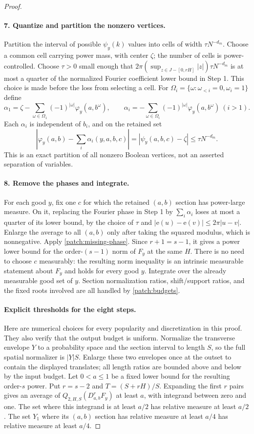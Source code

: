 \documentclass[11pt]{article}
\theoremstyle{definition}
\newcommand{\ee}[1]{\mathrm e\!\left(#1\right)}
\begin{document}
\begin{proof}
\paragraph{7. Quantize and partition the nonzero vertices.}
Partition the interval of possible $\psi_y(k)$ values into cells of width $\tau N^{-d_m}$.
Choose a common cell carrying power mass, with center $\zeta$; the number of cells is
power-controlled.  Choose $\tau>0$ small enough that
$2\pi(\sup_{z\in J-[0,rH]}|z|)\tau N^{-d_m}$ is at most a quarter of the normalized Fourier
coefficient lower bound in Step 1.  This choice is made before the loss from selecting a cell.
For $\Omega_i=\{\omega:\omega_{<i}=0,\omega_i=1\}$ define
\[
 \alpha_1=\zeta-\sum_{\omega\in\Omega_1}(-1)^{|\omega|}\varphi_y(a,b^\omega),
 \qquad
 \alpha_i=-\sum_{\omega\in\Omega_i}(-1)^{|\omega|}\varphi_y(a,b^\omega)\ (i>1).
\]
Each $\alpha_i$ is independent of $b_i$, and on the retained set
\[
 \left|\varphi_y(a,b)-\sum_i\alpha_i(y,a,b,c)\right|
       =|\psi_y(a,b,c)-\zeta|\leq\tau N^{-d_m}.
\]
This is an exact partition of all nonzero Boolean vertices, not an asserted separation of
variables.

\paragraph{8. Remove the phases and integrate.}
For each good $y$, fix one $c$ for which the retained $(a,b)$ section has power-large measure.
On it, replacing the Fourier phase in Step 1 by $\sum_i\alpha_i$ loses at most a quarter of
its lower bound, by the choice of $\tau$ and $|\ee u-\ee v|\leq2\pi|u-v|$.
Enlarge the average to all $(a,b)$ only after taking the squared modulus, which is nonnegative.
Apply \cref{patch:missing-phase}.  Since $r+1=s-1$, it gives a power lower bound for the
order-$(s-1)$ norm of $F_y$ at the same $H$.
There is no need to choose $c$ measurably: the resulting norm inequality is an intrinsic
measurable statement about $F_y$ and holds for every good $y$.
Integrate over the already measurable good set of $y$.  Section normalization ratios,
shift/support ratios, and the fixed roots involved are all handled by \cref{patch:budgets}.

\paragraph{Explicit thresholds for the eight steps.}
Here are numerical choices for every popularity and discretization in this proof. They also
verify that the output budget is uniform. Normalize the transverse envelope $Y$ to a probability
space and the section interval to length $S$, so the full spatial normalizer is $|Y|S$.
Enlarge these two envelopes once at the outset to contain the displayed translates; all
length ratios are bounded above and below by the input budget. Let $0<a\leq1$ be a
fixed lower bound for the resulting order-$s$ power. Put $r=s-2$ and $T=(S+rH)/S$.
Expanding the first $r$ pairs gives an average of $Q_{2,H,S}(D^r_{a,b}F_y)$ at least $a$,
with integrand between zero and one. The set where this integrand is at least $a/2$ has
relative measure at least $a/2$. The set $Y_1$ where its $(a,b)$ section has relative
measure at least $a/4$ has relative measure at least $a/4$.


\end{proof}
\end{document}
